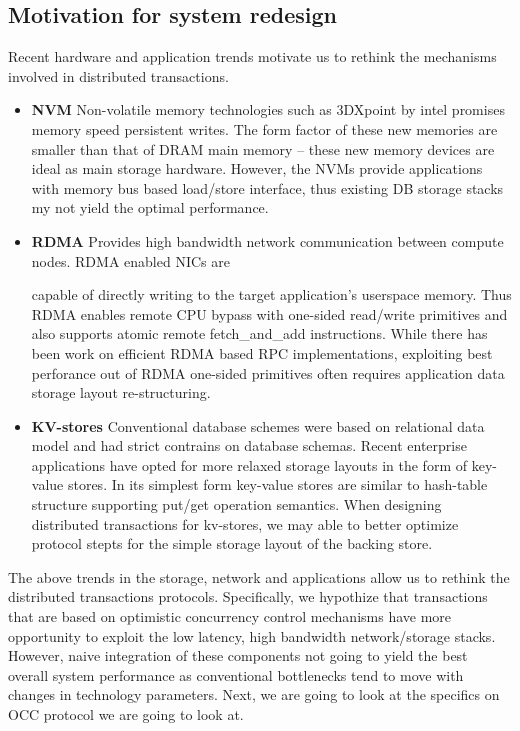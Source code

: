 \subsection{Motivation for system redesign}
Recent hardware and application trends motivate us to rethink the mechanisms involved in
distributed transactions.
\begin{itemize}

	\item{\bf NVM}
		Non-volatile memory technologies such as 3DXpoint by intel promises memory speed persistent
		writes. The form factor of these new memories are smaller than that of DRAM main memory -- these 
		new memory devices are ideal as main storage hardware. However, the NVMs provide applications with
		memory bus based load/store interface, thus existing DB storage stacks my not yield the optimal performance.
	\item{\bf RDMA} Provides high bandwidth network communication between compute nodes. RDMA enabled NICs are

		capable of directly writing to the target application's userspace memory. Thus RDMA enables remote
		CPU bypass with one-sided read/write primitives and also supports atomic remote fetch\_and\_add instructions.
		While there has been work on efficient RDMA based RPC implementations, exploiting best perforance out of 
		RDMA one-sided primitives often requires application data storage layout re-structuring.
	\item{\bf KV-stores}
		Conventional database schemes were based on relational data model and had strict contrains on database schemas.
		Recent enterprise applications have opted for more relaxed storage layouts in the form of key-value stores.
		In its simplest form key-value stores are similar to hash-table structure supporting put/get operation semantics.
		When designing distributed transactions for kv-stores, we may able to better optimize protocol stepts for the 
		simple storage layout of the backing store.

\end{itemize}

The above trends in the storage, network and applications allow us to rethink the distributed 
transactions protocols. Specifically, we hypothize that transactions that are based on optimistic
concurrency control mechanisms have more opportunity to exploit the low latency, high bandwidth
network/storage stacks. However, naive integration of these components not going to yield the 
best overall system performance as conventional bottlenecks tend to move with changes in 
technology parameters. Next, we are going to look at the specifics on OCC protocol we are going to 
look at.


